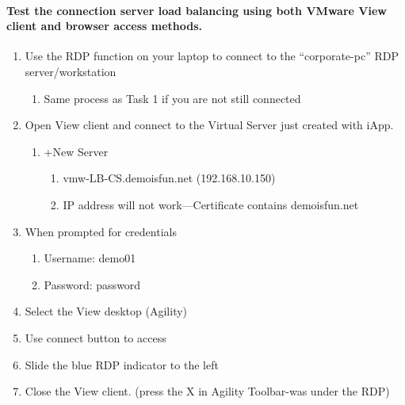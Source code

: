 \documentclass[letterpaper,10pt,english]{sphinxmanual}
\begin{document}
\paragraph{Test the connection server load balancing using both VMware View client and browser access methods.}
\label{\detokenize{class2/module1/lab1:test-the-connection-server-load-balancing-using-both-vmware-view-client-and-browser-access-methods}}\begin{enumerate}
\item {} 
Use the RDP function on your laptop to connect to the “corporate-pc”
RDP server/workstation
\begin{enumerate}
\item {} 
Same process as Task 1 if you are not still connected

\end{enumerate}

\item {} 
Open View client and connect to the Virtual Server just created with
iApp.
\begin{enumerate}
\item {} 
+New Server
\begin{enumerate}
\item {} 
vmw-LB-CS.demoisfun.net (192.168.10.150)

\item {} 
IP address will not work—Certificate contains demoisfun.net

\end{enumerate}

\end{enumerate}

\item {} 
When prompted for credentials
\begin{enumerate}
\item {} 
Username: demo01

\item {} 
Password: password

\end{enumerate}

\item {} 
Select the View desktop (Agility)

\item {} 
Use connect button to access

\item {} 
Slide the blue RDP indicator to the left

\item {} 
Close the View client. (press the X in Agility Toolbar-was under the
RDP)


\end{enumerate}
\end{document}
